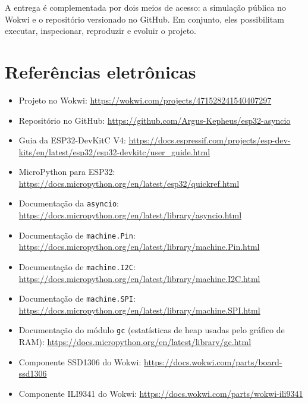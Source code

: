 \documentclass[12pt,a4paper]{article}
\newcommand{\WokwiURL}{https://wokwi.com/projects/471528241540407297}
\newcommand{\GitHubURL}{https://github.com/Argus-Kepheus/esp32-asyncio}
\begin{document}
A entrega é complementada por dois meios de acesso: a simulação pública no Wokwi e o repositório versionado no GitHub. Em conjunto, eles possibilitam executar, inspecionar, reproduzir e evoluir o projeto.

\section*{Referências eletrônicas}

\begin{itemize}
  \item Projeto no Wokwi: \url{\WokwiURL}
  \item Repositório no GitHub: \url{\GitHubURL}
  \item Guia da ESP32-DevKitC V4: \url{https://docs.espressif.com/projects/esp-dev-kits/en/latest/esp32/esp32-devkitc/user_guide.html}
  \item MicroPython para ESP32: \url{https://docs.micropython.org/en/latest/esp32/quickref.html}
  \item Documentação da \texttt{asyncio}: \url{https://docs.micropython.org/en/latest/library/asyncio.html}
  \item Documentação de \texttt{machine.Pin}: \url{https://docs.micropython.org/en/latest/library/machine.Pin.html}
  \item Documentação de \texttt{machine.I2C}: \url{https://docs.micropython.org/en/latest/library/machine.I2C.html}
  \item Documentação de \texttt{machine.SPI}: \url{https://docs.micropython.org/en/latest/library/machine.SPI.html}
  \item Documentação do módulo \texttt{gc} (estatísticas de heap usadas pelo gráfico de RAM): \url{https://docs.micropython.org/en/latest/library/gc.html}
  \item Componente SSD1306 do Wokwi: \url{https://docs.wokwi.com/parts/board-ssd1306}
  \item Componente ILI9341 do Wokwi: \url{https://docs.wokwi.com/parts/wokwi-ili9341}
\end{itemize}
\end{document}
